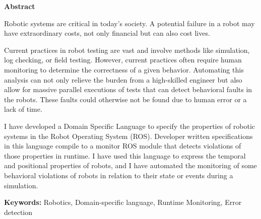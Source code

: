 \vspace*{2cm}
\begin{center}
\Large \bf Abstract
\end{center}
\vspace*{1cm} \setlength{\baselineskip}{0.6cm}

Robotic systems are critical in today's society. A potential failure in a robot may have extraordinary costs, not only financial but can also cost lives.

Current practices in robot testing are vast and involve methods like simulation, log checking, or field testing. However, current practices often require human monitoring to determine the correctness of a given behavior. Automating this analysis can not only relieve the burden from a high-skilled engineer but also allow for massive parallel executions of tests that can detect behavioral faults in the robots. These faults could otherwise not be found due to human error or a lack of time.
    
I have developed a Domain Specific Language to specify the properties of robotic systems in the Robot Operating System (ROS). Developer written specifications in this language compile to a monitor ROS module that detects violations of those properties in runtime. I have used this language to express the temporal and positional properties of robots, and I have automated the monitoring of some behavioral violations of robots in relation to their state or events during a simulation.

\vfill

\begin{flushleft}
\textbf{Keywords:}
Robotics, Domain-specific language, Runtime Monitoring, Error detection
\end{flushleft}

